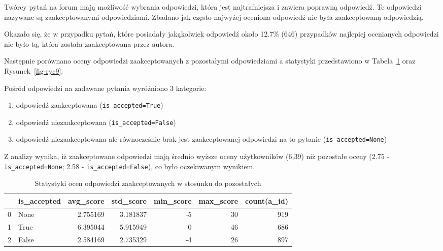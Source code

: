 \documentclass[
  letterpaper,
  DIV=11,
  numbers=noendperiod]{scrreprt}
\providecommand{\tightlist}{%
  \setlength{\itemsep}{0pt}\setlength{\parskip}{0pt}}\usepackage{longtable,booktabs,array}
\begin{document}
Twórcy pytań na forum mają możliwość wybrania odpowiedzi, która jest
najtrafniejsza i zawiera poprawną odpowiedź. Te odpowiedzi nazywane są
zaakceptowanymi odpowiedziami. Zbadano jak często najwyżej oceniona
odpowiedź nie była zaakceptowaną odpowiedzią.

Okazało się, że w przypadku pytań, które posiadały jakąkolwiek odpowiedź
około 12.7\% (646) przypadków najlepiej ocenianych odpowiedzi nie było
tą, która została zaakceptowana przez autora.

Następnie porównano oceny odpowiedzi zaakceptowanych z pozostałymi
odpowiedziami a statystyki przedstawiono w Tabela~\ref{tbl-a_stats} oraz
Rysunek~\ref{fig-ryc9}.

Pośród odpowiedzi na zadawane pytania wyróżniono 3 kategorie:

\begin{enumerate}
\def\labelenumi{\arabic{enumi}.}
\tightlist
\item
  odpowiedź zaakceptowana (\texttt{is\_accepted=True})
\item
  odpowiedź niezaakceptowana (\texttt{is\_accepted=False})
\item
  odpowiedź niezaakceptowana ale równocześnie brak jest zaakceptowanej
  odpowiedzi na to pytanie (\texttt{is\_accepted=None})
\end{enumerate}

Z analizy wynika, iż zaakceptowane odpowiedzi mają średnio wyższe oceny
użytkowników (6,39) niż pozostałe oceny (2.75 -
\texttt{is\_accepted=None}; 2.58 - \texttt{is\_accepted=False}), co było
oczekiwanym wynikiem.

\hypertarget{tbl-a_stats}{}
\begin{table}
\caption{\label{tbl-a_stats}Statystyki ocen odpowiedzi zaakceptowanych w stosunku do pozostałych }\tabularnewline

\centering
\begin{tabular}{llrrrrr}
\toprule
{} & is\_accepted &  avg\_score &  std\_score &  min\_score &  max\_score &  count(a\_id) \\
\midrule
0 &        None &   2.755169 &   3.181837 &         -5 &         30 &          919 \\
1 &        True &   6.395044 &   5.915949 &          0 &         46 &          686 \\
2 &       False &   2.584169 &   2.735329 &         -4 &         26 &          897 \\
\bottomrule
\end{tabular}
\end{table}
\end{document}
